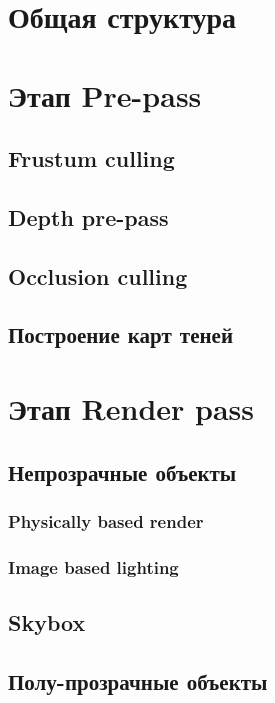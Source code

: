 \section{Общая структура} \label{ch3:pipeline_struct}
\section{Этап Pre-pass} \label{ch3:pre_pass}
	\subsection{Frustum culling} \label{ch3:pre_pass:frustum}
	\subsection{Depth pre-pass} \label{ch3:pre_pass:depth}
	\subsection{Occlusion culling} \label{ch3:pre_pass:occlusion}
	\subsection{Построение карт теней} \label{ch3:pre_pass:shadow_maps}
\section{Этап Render pass} \label{ch3:render_pass}
	\subsection{Непрозрачные объекты} \label{ch3:render_pass:opaque}
		\subsubsection{Physically based render} \label{ch3:render_pass:opaque:pbr}
		\subsubsection{Image based lighting} \label{ch3:render_pass:opaque:ibl}
	\subsection{Skybox} \label{ch3:render_pass:skybox}
	\subsection{Полу-прозрачные объекты} \label{ch3:render_pass:transparents}
